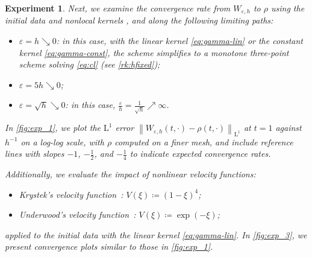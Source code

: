 \documentclass[10pt]{amsart}
\theoremstyle{plain}
\newtheorem{example}{Experiment}[section]
\theoremstyle{definition}
\numberwithin{equation}{section}
\newcommand{\eps}{{\varepsilon}}
\newcommand{\norm}[1]{\left\lVert#1\right\rVert}
\begin{document}
\begin{example}
Next, we examine the convergence rate from $W_{\eps,h}$ to $\rho$ using the initial data  and nonlocal kernels , and along the following limiting paths:
\begin{itemize}
    \item $\eps=h\searrow 0$: in this case, with the linear kernel \cref{eq:gamma-lin} or the constant kernel \cref{eq:gamma-const}, the scheme simplifies to a monotone three-point scheme solving \cref{eq:cl} (see \cref{rk:hfixed});
    \item $\eps=5h\searrow 0$;
    \item $\eps=\sqrt{h}\searrow 0$: in this case, $\frac{\eps}h=\frac1{\sqrt{h}}\nearrow\infty$.
\end{itemize}
In \cref{fig:exp_1}, we plot the $\mathrm{L}^1$ error $\norm{W_{\eps,h}(t,\cdot)-\rho(t,\cdot)}_{\mathrm{L}^1}$ at $t=1$ against $h^{-1}$ on a log-log scale, with $\rho$ computed on a finer mesh, and include reference lines with slopes $-1$, $-\frac12$, and $-\frac14$ to indicate expected convergence rates.

Additionally, we evaluate the impact of nonlinear velocity functions:
\begin{itemize}
    \item Krystek's velocity function~\cite{krystek1980syntetyczny}: $V(\xi)\coloneqq (1-\xi)^4$;
    \item Underwood's velocity function~\cite{underwood1961speed}: $V(\xi)\coloneqq \exp(-\xi)$;
\end{itemize}
applied to the initial data  with the linear kernel \cref{eq:gamma-lin}. In \cref{fig:exp_3}, we present convergence plots similar to those in \cref{fig:exp_1}.
\end{example}
\end{document}
